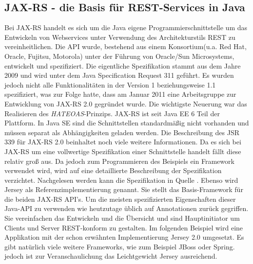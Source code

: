 \documentclass[fleqn,10.5pt,ngerman]{SelfArx}
\begin{document}
\subsection{JAX-RS - die Basis für REST-Services in Java}
Bei JAX-RS handelt es sich um die Java eigene Programmierschnittstelle um das Entwickeln von Webservices unter Verwendung des Architekturstils REST zu vereinheitlichen. Die API wurde, bestehend aus einem Konsortium(u.a. Red Hat, Oracle, Fujitsu, Motorola) unter der Führung von Oracle/Sun Microsystems, entwickelt und spezifiziert. Die eigentliche Spezifikation \cite{jaxrs1.1} stammt aus dem Jahre 2009 und wird unter dem Java Specification Request \cite{spezreq} 311 geführt. Es wurden jedoch nicht alle Funktionalitäten in der Version 1 beziehungsweise 1.1 spezifiziert, was zur Folge hatte, dass am Januar 2011 eine Arbeitsgruppe zur Entwicklung von JAX-RS 2.0 gegründet wurde. Die wichtigste Neuerung war das Realisieren des \textit{HATEOAS}-Prinzips. JAX-RS ist seit Java EE 6 Teil der Plattform. In Java SE sind die Schnittstellen standardmäßig nicht vorhanden und müssen separat als Abhängigkeiten geladen werden. Die Beschreibung des JSR 339 für JAX-RS 2.0 \cite{spezJSR339} beinhaltet noch viele weitere Informationen. Da es sich bei JAX-RS um eine vollwertige Spezifikation einer Schnittstelle handelt fällt diese relativ groß aus. Da jedoch zum Programmieren des Beispiels ein Framework verwendet wird, wird auf eine detaillierte Beschreibung der Spezifikation verzichtet. Nachgelesen werden kann die Spezifikation in Quelle \cite{jaxrs1.1}. Ebenso wird Jersey \cite{jersey} als Referenzimplementierung genannt. Sie stellt das Basis-Framework für die beiden JAX-RS API's. Um die meisten spezifizierten Eigenschaften dieser Java-API zu verwenden wie heutzutage üblich auf Annotationen zurück gegriffen. Sie vereinfachen das Entwickeln und die Übersicht und sind Hauptinitiator um Clients und Server REST-konform zu gestalten. Im folgenden Beispiel wird eine Applikation mit der schon erwähnten Implementierung Jersey 2.0 umgesetzt. Es gibt natürlich viele weitere Frameworks, wie zum Beispiel JBoss oder Spring. jedoch ist zur Veranschaulichung das Leichtgewicht Jersey ausreichend.
\end{document}
